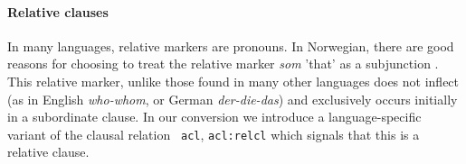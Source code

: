 \documentclass[11pt,a4paper]{article}
\let\w=\emph
\begin{document}
\paragraph{Relative clauses}
In many languages, relative markers are pronouns. In Norwegian, there
are good reasons for choosing to treat the relative marker {\it som}
'that' as a subjunction \cite{Faa:Lie:Van:97}. This relative marker,
unlike those found in many other languages does not inflect (as in
English {\it who-whom}, or German {\it der-die-das}) and exclusively
occurs initially in a subordinate clause. In our conversion we
introduce a language-specific variant of the clausal relation {\tt
  acl}, {\tt acl:relcl} which signals that this is a relative clause.
\end{document}
